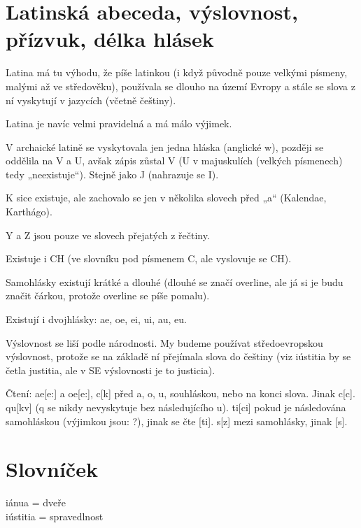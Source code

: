 \documentclass[12pt]{article}					%
\begin{document}
\section{Latinská abeceda, výslovnost, přízvuk, délka hlásek}
Latina má tu výhodu, že píše latinkou (i když původně pouze velkými písmeny, malými až ve středověku), používala se dlouho na území Evropy a stále se slova z ní vyskytují v jazycích (včetně češtiny).

    Latina je navíc velmi pravidelná a má málo výjimek. 

    V archaické latině se vyskytovala jen jedna hláska (anglické w), později se oddělila na V a U, avšak zápis zůstal V (U v majuskulích (velkých písmenech) tedy „neexistuje“). Stejně jako J (nahrazuje se I).

    K sice existuje, ale zachovalo se jen v několika slovech před „a“ (Kalendae, Karthágo).

    Y a Z jsou pouze ve slovech přejatých z řečtiny.

    Existuje i CH (ve slovníku pod písmenem C, ale vyslovuje se CH).

    Samohlásky existují krátké a dlouhé (dlouhé se značí overline, ale já si je budu značit čárkou, protože overline se píše pomalu).

    Existují i dvojhlásky: ae, oe, ei, ui, au, eu.

    Výslovnost se liší podle národnosti. My budeme používat středoevropskou výslovnost, protože se na základě ní přejímala slova do češtiny (viz iústitia by se četla justitia, ale v SE výslovnosti je to justicia).

    Čtení: ae[e:] a oe[e:], c[k] před a, o, u, souhláskou, nebo na konci slova. Jinak c[c]. qu[kv] (q se nikdy nevyskytuje bez následujícího u). ti[ci] pokud je následována samohláskou (výjimkou jsou: ?), jinak se čte [ti]. s[z] mezi samohlásky, jinak [s].















\newpage
\section{Slovníček}
    iánua = dveře\\
    iústitia = spravedlnost\\
\end{document}
